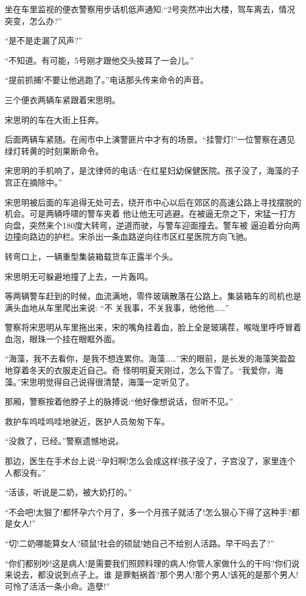 \documentclass[11pt,a4paper,onecolumn]{article}
\begin{document}
坐在车里监视的便衣警察用步话机低声通知:``2号突然冲出大楼，驾车离去，情况突变，怎么办?''

``是不是走漏了风声?''

``不知道。有可能，5号刚才跟他交头接耳了一会儿。''

``提前抓捕!不要让他逃跑了。''电话那头传来命令的声音。

三个便衣两辆车紧跟着宋思明。

宋思明的车在大街上狂奔。

后面两辆车紧随。在闹市中上演警匪片中才有的场景。``挂警灯!''一位警察在遇见绿灯转黄的时刻果断命令。

宋思明的手机响了，是沈律师的电话:``在红星妇幼保健医院。孩子没了，海藻的子宫正在摘除中。''

宋思明被后面的车追得无处可去，绕开市中心以后在郊区的高速公路上寻找摆脱的机会。可是两辆呼啸的警车夹着
他让他无可逃避。在被逼无奈之下，宋猛一打方向盘，突然来个180度大转弯，逆道而驶，与警车迎面撞去。警车被
逼迫着分向两边撞向路边的护栏。宋杀出一条血路逆向往市区红星医院方向飞驰。

转弯口上，一辆重型集装箱载货车正露半个头。

宋思明无可躲避地撞了上去，一片轰鸣。

等两辆警车赶到的时候，血流满地，零件玻璃散落在公路上。集装箱车的司机也是满头血地从车里爬出来说: ``不
关我事，不关我事，他他他……''

警察将宋思明从车里拖出来，宋的嘴角挂着血，脸上全是玻璃茬，喉咙里呼呼冒着血泡，眼珠一个挂在眼眶外面。

``海藻，我不去看你，是我不想连累你。海藻……''宋的眼前，是长发的海藻笑盈盈地穿着冬天的衣服走近自己。奇
怪明明夏天刚过，怎么下雪了。``我爱你，海藻。''宋思明觉得自己说得很清楚，海藻一定听见了。

那厢，警察按着他脖子上的脉搏说:``他好像想说话，但听不见。''

救护车呜哇呜哇地驶近，医护人员匆匆下车。

``没救了，已经。''警察遗憾地说。

那边，医生在手术台上说:``孕妇啊!怎么会成这样!孩子没了，子宫没了，家里连个人都没有。''

``活该，听说是二奶，被大奶打的。''

``不会吧!太狠了!都怀孕六个月了，多一个月孩子就活了!怎么狠心下得了这种手?都是女人!''

``切!二奶哪能算女人?硕鼠!社会的硕鼠!她自己不给别人活路。早干吗去了?''

``你们都别吵!这是病人!是需要我们照顾料理的病人!你管人家做什么的干吗?你们说来说去，都没说到点子上。谁
是罪魁祸首?那个男人!那个男人!该死的是那个男人!可怜了活活一条小命。造孽!''
\end{document}
